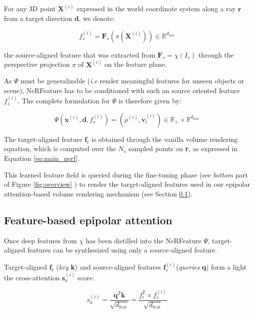 For any 3D point $\mathbf{X}^{(i)}$ expressed in the world coordinate system along a ray $\mathbf{r}$ from a target direction $\mathbf{d}$, we denote: 

\begin{equation}
    f_{s}^{(i)} = \mathbf{F}_{s}(\pi(\mathbf{X}^{(i)}))  \in \mathbb{R}^{d_{\text{feat}}} 
    \label{eq:projection}
\end{equation}

the source-aligned feature that was extracted from $\mathbf{F}_{s}=\chi(I_{s})$ through the perspective projection $\pi$ of $\mathbf{X}^{(i)}$ on the feature plane.

As $\Psi$ must be generalizable (\textit{i.e} render meaningful features for unseen objects or scene), NeRFeature has to be conditioned with such an source oriented feature $f_{s}^{(i)}$. The complete formulation for $\Psi$ is therefore given by:

\begin{equation}
    \Psi(\mathbf{x}^{(i)},\mathbf{d},f_{s}^{(i)}) = (\rho^{(i)},\mathbf{v}_{t}^{(i)}) \in \mathbb{R}_{+}\times \mathbb{R}^{d_{\text{feat}}}
\end{equation}

The target-aligned feature $\mathbf{f}_{t}$ is obtained through the vanilla volume rendering equation, which is computed over the $N_s$ sampled points on \textbf{r}, as expressed in Equation \eqref{eq:main_nerf}.

This learned feature field is queried during the fine-tuning phase (see \textit{bottom} part of Figure \ref{fig:overview} ) to render the target-aligned features used in our epipolar attention-based volume rendering mechanism (see Section \ref{subsec:epipolar_att}). 

\subsection{Feature-based epipolar attention}
\label{subsec:epipolar_att}

Once deep features from $\chi$ has been distilled into the NeRFeature $\Psi$, target-aligned features can be synthesized using only a source-aligned feature. 

Target-aligned $\mathbf{f}_{t}$ (\textit{key} \textbf{k}) and source-aligned features $\mathbf{f}_{s}^{(i)}$(\textit{queries} \textbf{q}) form a light the cross-attention \citep{vaswani2017attention} $\mathbf{s}_{a}^{(i)}$ score:

\begin{equation}
    s_{a}^{(i)} = \frac{\mathbf{q}^{T}\mathbf{k}}{\sqrt{d_{\text{feat}}}}= \frac{f_{t}^{T}\times f_{s}^{(i)}}{\sqrt{d_{\text{feat}}}}
\label{eq:attention}
\end{equation}

